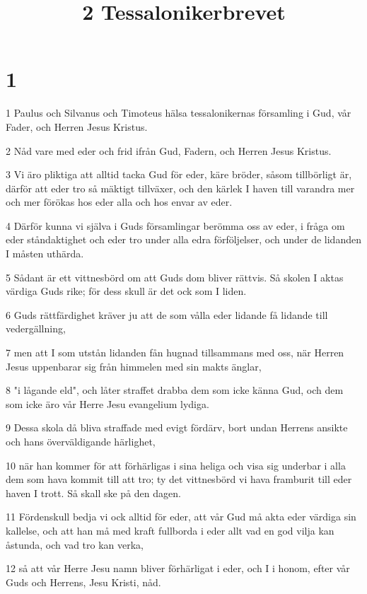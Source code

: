 

\title{2 Tessalonikerbrevet}


\chapter{1}

\par 1 Paulus och Silvanus och Timoteus hälsa tessalonikernas församling i Gud, vår Fader, och Herren Jesus Kristus.
\par 2 Nåd vare med eder och frid ifrån Gud, Fadern, och Herren Jesus Kristus.
\par 3 Vi äro pliktiga att alltid tacka Gud för eder, käre bröder, såsom tillbörligt är, därför att eder tro så mäktigt tillväxer, och den kärlek I haven till varandra mer och mer förökas hos eder alla och hos envar av eder.
\par 4 Därför kunna vi själva i Guds församlingar berömma oss av eder, i fråga om eder ståndaktighet och eder tro under alla edra förföljelser, och under de lidanden I måsten uthärda.
\par 5 Sådant är ett vittnesbörd om att Guds dom bliver rättvis. Så skolen I aktas värdiga Guds rike; för dess skull är det ock som I liden.
\par 6 Guds rättfärdighet kräver ju att de som vålla eder lidande få lidande till vedergällning,
\par 7 men att I som utstån lidanden fån hugnad tillsammans med oss, när Herren Jesus uppenbarar sig från himmelen med sin makts änglar,
\par 8 "i lågande eld", och låter straffet drabba dem som icke känna Gud, och dem som icke äro vår Herre Jesu evangelium lydiga.
\par 9 Dessa skola då bliva straffade med evigt fördärv, bort undan Herrens ansikte och hans överväldigande härlighet,
\par 10 när han kommer för att förhärligas i sina heliga och visa sig underbar i alla dem som hava kommit till att tro; ty det vittnesbörd vi hava framburit till eder haven I trott. Så skall ske på den dagen.
\par 11 Fördenskull bedja vi ock alltid för eder, att vår Gud må akta eder värdiga sin kallelse, och att han må med kraft fullborda i eder allt vad en god vilja kan åstunda, och vad tro kan verka,
\par 12 så att vår Herre Jesu namn bliver förhärligat i eder, och I i honom, efter vår Guds och Herrens, Jesu Kristi, nåd.

